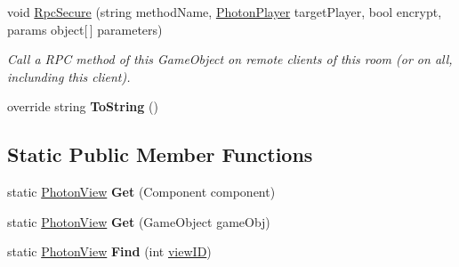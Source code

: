 \begin{DoxyCompactItemize}
void \hyperlink{class_photon_view_ab6f075ebed73c05fa1c9ea6e81b66cca}{Rpc\+Secure} (string method\+Name, \hyperlink{class_photon_player}{Photon\+Player} target\+Player, bool encrypt, params object\mbox{[}$\,$\mbox{]} parameters)
\begin{DoxyCompactList}\small\item\em Call a R\+PC method of this Game\+Object on remote clients of this room (or on all, inclunding this client). \end{DoxyCompactList}\item 
override string {\bfseries To\+String} ()\hypertarget{class_photon_view_aaa61ad448b005df342350762476e367d}{}\label{class_photon_view_aaa61ad448b005df342350762476e367d}

\end{DoxyCompactItemize}
\subsection*{Static Public Member Functions}
\begin{DoxyCompactItemize}
\item 
static \hyperlink{class_photon_view}{Photon\+View} {\bfseries Get} (Component component)\hypertarget{class_photon_view_ace8c64cae230e1fbd3356112274e4d8d}{}\label{class_photon_view_ace8c64cae230e1fbd3356112274e4d8d}

\item 
static \hyperlink{class_photon_view}{Photon\+View} {\bfseries Get} (Game\+Object game\+Obj)\hypertarget{class_photon_view_a24370932ff0a1f79d6dcb83a2bd7a27b}{}\label{class_photon_view_a24370932ff0a1f79d6dcb83a2bd7a27b}

\item 
static \hyperlink{class_photon_view}{Photon\+View} {\bfseries Find} (int \hyperlink{class_photon_view_a309ddedb443400696cf80da2ff579262}{view\+ID})\hypertarget{class_photon_view_a84084cfaf09debaf88362629bb772907}{}\label{class_photon_view_a84084cfaf09debaf88362629bb772907}

\end{DoxyCompactItemize}

